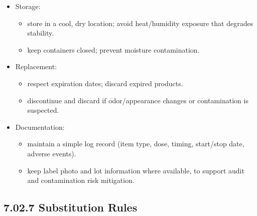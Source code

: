 \documentclass[10pt]{article}
\begin{document}
\begin{itemize}
\item Storage:
  \begin{itemize}
  \item store in a cool, dry location; avoid heat/humidity exposure that degrades stability.
  \item keep containers closed; prevent moisture contamination.
  \end{itemize}
\item Replacement:
  \begin{itemize}
  \item respect expiration dates; discard expired products.
  \item discontinue and discard if odor/appearance changes or contamination is suspected.
  \end{itemize}
\item Documentation:
  \begin{itemize}
  \item maintain a simple log record (item type, dose, timing, start/stop date, adverse events).
  \item keep label photo and lot information where available, to support audit and contamination risk mitigation.
  \end{itemize}
\end{itemize}

\subsection*{7.02.7 Substitution Rules}
{}
\end{document}
